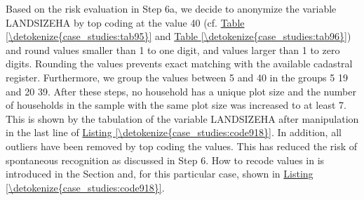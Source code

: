 \documentclass[letterpaper,10pt,english]{sphinxmanual}
\begin{document}
Based on the risk evaluation in Step 6a, we decide to anonymize the
variable LANDSIZEHA by top coding at the value 40 (cf. \hyperref[\detokenize{case_studies:tab95}]{Table \ref{\detokenize{case_studies:tab95}}} and
\hyperref[\detokenize{case_studies:tab96}]{Table \ref{\detokenize{case_studies:tab96}}}) and round values smaller than 1 to one digit, and values
larger than 1 to zero digits. Rounding the values prevents exact
matching with the available cadastral register. Furthermore, we group
the values between 5 and 40 in the groups 5 \textendash{} 19 and 20 \textendash{} 39. After
these steps, no household has a unique plot size and the number of
households in the sample with the same plot size was increased to at
least 7. This is shown by the tabulation of the variable LANDSIZEHA
after manipulation in the last line of \hyperref[\detokenize{case_studies:code918}]{Listing \ref{\detokenize{case_studies:code918}}}. In addition, all
outliers have been removed by top coding the values. This has reduced
the risk of spontaneous recognition as discussed in Step 6. How to
recode values in  is introduced in the Section 
and, for this particular case, shown in \hyperref[\detokenize{case_studies:code918}]{Listing \ref{\detokenize{case_studies:code918}}}.
\end{document}

